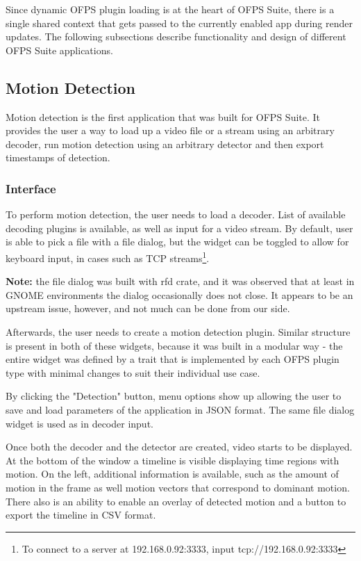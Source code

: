 \documentclass[11pt,english]{report}
\begin{document}
Since dynamic OFPS plugin loading is at the heart of OFPS Suite, there is a single shared context that gets passed to the currently enabled app during render updates. The following subsections describe functionality and design of different OFPS Suite applications.

\subsection{Motion Detection}

Motion detection is the first application that was built for OFPS Suite. It provides the user a way to load up a video file or a stream using an arbitrary decoder, run motion detection using an arbitrary detector and then export timestamps of detection.

\subsubsection{Interface}

To perform motion detection, the user needs to load a decoder. List of available decoding plugins is available, as well as input for a video stream. By default, user is able to pick a file with a file dialog, but the widget can be toggled to allow for keyboard input, in cases such as TCP streams\footnote{To connect to a server at 192.168.0.92:3333, input tcp://192.168.0.92:3333}.

\textbf{Note:} the file dialog was built with rfd crate, and it was observed that at least in GNOME environments the dialog occasionally does not close. It appears to be an upstream issue, however, and not much can be done from our side.

Afterwards, the user needs to create a motion detection plugin. Similar structure is present in both of these widgets, because it was built in a modular way - the entire widget was defined by a trait that is implemented by each OFPS plugin type with minimal changes to suit their individual use case. 

By clicking the "Detection" button, menu options show up allowing the user to save and load parameters of the application in JSON format. The same file dialog widget is used as in decoder input.

Once both the decoder and the detector are created, video starts to be displayed. At the bottom of the window a timeline is visible displaying time regions with motion. On the left, additional information is available, such as the amount of motion in the frame as well motion vectors that correspond to dominant motion. There also is an ability to enable an overlay of detected motion and a button to export the timeline in CSV format.
\end{document}
